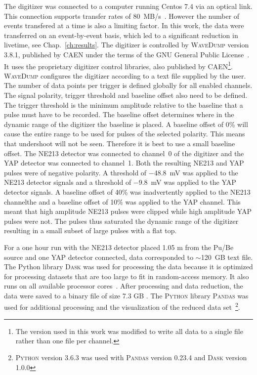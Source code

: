 \documentclass[main.tex]{subfiles}
\begin{document}
The digitizer was connected to a computer running Centos 7.4 via an optical link. This connection supports transfer rates of \SI{80}{MB/s}~\cite{CAEN}. However the number of events transfered at a time is also a limiting factor. In this work, the data were transferred on an event-by-event basis, which led to a significant reduction in livetime, see Chap.~\ref{ch:results}. The digitizer is controlled by \textsc{WaveDump} version 3.8.1, published by CAEN under the terms of the GNU General Public License~\cite{WaveDump}. It uses the proprietary digitizer control libraries, also published by CAEN\footnote{The version used in this work was modified to write all data to a single file rather than one file per channel.}. 
\textsc{WaveDump} configures the digitizer according to a text file supplied by the user. The number of data points per trigger is defined globally for all enabled channels. The signal polarity, trigger threshold and baseline offset also need to be defined. The trigger threshold is the minimum amplitude relative to the baseline that a pulse must have to be recorded. The baseline offset determines where in the dynamic range of the digitizer the baseline is placed. A baseline offset of 0\% will cause the entire range to be used for pulses of the selected polarity. This means that undershoot will not be seen. Therefore it is best to use a small baseline offset. The NE213 detector was connected to channel~0 of the digitizer and the YAP detector was connected to channel~1. Both the resulting NE213 and YAP pulses were of negative polarity. A threshold of \SI{-48.8}{mV} was applied to the NE213 detector signals and a threshold of \SI{-9.8}{mV} was applied to the YAP detector signals. A baseline offset of 40\% was inadvertently applied to the NE213 channelthe and a baseline offset of 10\% was applied to the YAP channel. This meant that high amplitude NE213 pulses were clipped while high amplitude YAP pulses were not. The pulses thus saturated the dynamic range of the digitizer resulting in a small subset of large pulses with a flat top.

For a one hour run with the NE213 detector placed 1.05 m from the Pu/Be source and one YAP detector connected, data corresponded to $\sim$\SI{120}{GB} text file. The Python library \textsc{Dask} was used for processing the data because it is optimized for processing datasets that are too large to fit in random-access memory. It also runs on all available processor cores~\cite{Dask}. After processing and data reduction, the data were saved to a binary file of size 7.3 GB . The \textsc{Python} library \textsc{Pandas} was used for additional processing and the visualization of the reduced data set~\cite{Pandas}\footnote{\textsc{Python} version 3.6.3 was used with \textsc{Pandas} version 0.23.4 and \textsc{Dask} version 1.0.0}.
\end{document}
